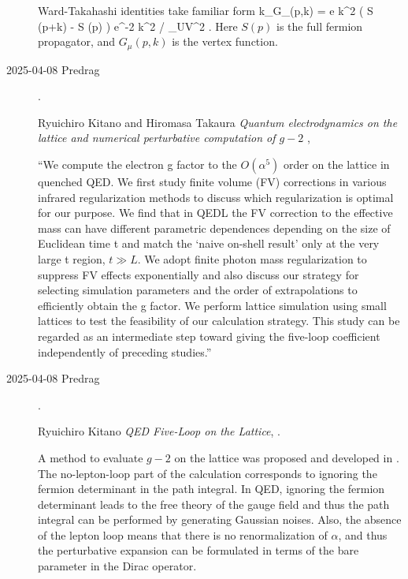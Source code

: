 \begin{description}
Ward-Takahashi identities take familiar form
\beq
 \hat k_\mu G_\mu (p,k) 
= {e \xi \over \hat k^2} \left(
S (p+k) - S (p)
\right) e^{-2 \hat k^2 / \Lambda_{\rm UV}^2} .
Here $S(p)$ is the full fermion propagator, and $G_\mu (p,k)$ is
the vertex function.


\item[2025-04-08 Predrag].
 \label{post:KitTak23}

Ryuichiro Kitano and Hiromasa Takaura
{\em Quantum electrodynamics on the lattice and
numerical perturbative computation of  {$g-2$} },

``We compute the electron g factor to the  $O(\alpha^5)$ order on the 
lattice in quenched QED. We first study finite volume (FV) corrections in 
various infrared regularization methods to discuss which regularization 
is optimal for our purpose. We find that in QEDL the FV correction to the 
effective mass can have different parametric dependences depending on the 
size of Euclidean time t and match the ‘naive on-shell result’ only at 
the very large t region, $t \gg L$. We adopt finite photon mass 
regularization to suppress FV effects exponentially and also discuss our 
strategy for selecting simulation parameters and the order of 
extrapolations to efficiently obtain the g factor. We perform lattice 
simulation using small lattices to test the feasibility of our 
calculation strategy. This study can be regarded as an intermediate step 
toward giving the five-loop coefficient independently of preceding 
studies.''


\item[2025-04-08 Predrag].
 \label{post:Kitano24}

Ryuichiro Kitano
{\em QED Five-Loop on the Lattice},
.

A method to evaluate {$g-2$} on the lattice was proposed and developed in 
. The no-lepton-loop part of the 
calculation corresponds to ignoring the fermion determinant in the path 
integral. In QED, ignoring the fermion determinant leads to the free 
theory of the gauge field and thus the path integral can be  
performed by generating Gaussian noises. Also, the absence of the lepton 
loop means that there is no renormalization of $\alpha$, and thus the 
perturbative expansion can be formulated in terms of the bare parameter 
in the Dirac operator.


\end{description}
